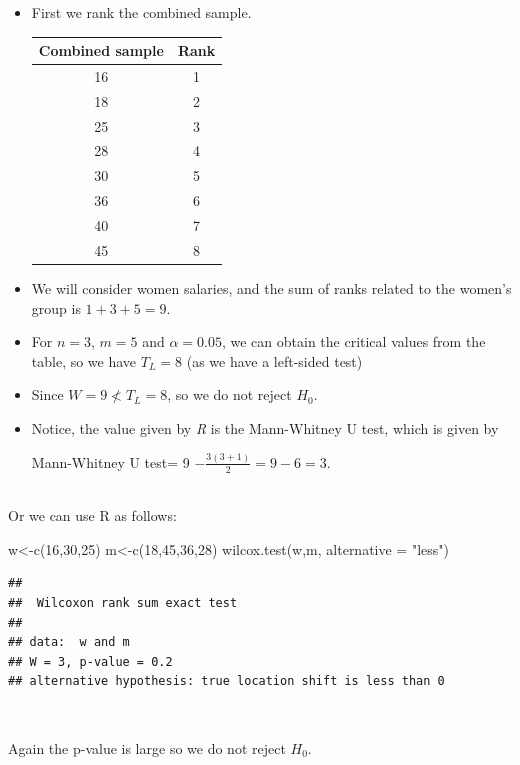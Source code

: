 \documentclass[
]{article}
\newcommand{\AttributeTok}[1]{\textcolor[rgb]{0.77,0.63,0.00}{#1}}
\newcommand{\DecValTok}[1]{\textcolor[rgb]{0.00,0.00,0.81}{#1}}
\newcommand{\FunctionTok}[1]{\textcolor[rgb]{0.00,0.00,0.00}{#1}}
\newcommand{\NormalTok}[1]{#1}
\newcommand{\OtherTok}[1]{\textcolor[rgb]{0.56,0.35,0.01}{#1}}
\newcommand{\StringTok}[1]{\textcolor[rgb]{0.31,0.60,0.02}{#1}}
\begin{document}
\begin{itemize}
\item
  First we rank the combined sample.

  \begin{longtable}[]{@{}cc@{}}
  \toprule()
  Combined sample & Rank \\
  \midrule()
  \endhead
  16 & 1 \\
  18 & 2 \\
  25 & 3 \\
  28 & 4 \\
  30 & 5 \\
  36 & 6 \\
  40 & 7 \\
  45 & 8 \\
  \bottomrule()
  \end{longtable}
\item
  We will consider women salaries, and the sum of ranks related to the
  women's group is \(1+3+5=9\).
\item
  For \(n=3\), \(m=5\) and \(\alpha=0.05\), we can obtain the critical
  values from the table, so we have \(T_L=8\) (as we have a left-sided
  test)
\item
  Since \(W=9 \nless T_L=8\), so we do not reject \(H_0\).
\item
  Notice, the value given by \emph{R} is the Mann-Whitney U test, which
  is given by

  Mann-Whitney U test= 9 \(- \frac{3(3+1)}{2}=9-6=3\).
\end{itemize}

\(~\)\\
Or we can use R as follows:

\begin{Highlighting}[]
\NormalTok{w}\OtherTok{\textless{}{-}}\FunctionTok{c}\NormalTok{(}\DecValTok{16}\NormalTok{,}\DecValTok{30}\NormalTok{,}\DecValTok{25}\NormalTok{)}
\NormalTok{m}\OtherTok{\textless{}{-}}\FunctionTok{c}\NormalTok{(}\DecValTok{18}\NormalTok{,}\DecValTok{45}\NormalTok{,}\DecValTok{36}\NormalTok{,}\DecValTok{28}\NormalTok{)  }
\FunctionTok{wilcox.test}\NormalTok{(w,m, }\AttributeTok{alternative =} \StringTok{"less"}\NormalTok{) }
\end{Highlighting}

\begin{verbatim}
## 
##  Wilcoxon rank sum exact test
## 
## data:  w and m
## W = 3, p-value = 0.2
## alternative hypothesis: true location shift is less than 0
\end{verbatim}

\(~\)

Again the p-value is large so we do not reject \(H_0\).
\end{document}
